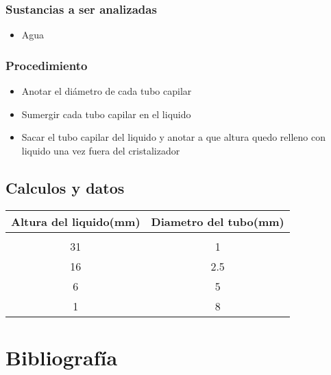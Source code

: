 \documentclass[11pt, letterpaper]{article}
\begin{document}
\subsubsection{Sustancias a ser analizadas}
\begin{itemize}
	\item Agua
\end{itemize}
\subsubsection{Procedimiento}
\begin{itemize}
	\item Anotar el diámetro de cada tubo capilar
	\item Sumergir cada tubo capilar en el liquido 
	\item Sacar el tubo capilar del liquido y anotar a que altura quedo relleno con liquido una vez fuera del cristalizador
\end{itemize}
\subsection{Calculos y datos}
  \begin{center}
    \begin{tabular}{|c|c|}
    \toprule
    \rowcolor[rgb]{ .776,  .878,  .706} Altura del liquido(mm) & Diametro del tubo(mm) \\
    \midrule
    \rowcolor[rgb]{ 1,  1,  0} \multicolumn{2}{|c|}{Agua} \\
    \midrule
    31    & 1 \\
    \midrule
    16    & 2.5 \\
    \midrule
    6     & 5 \\
    \midrule
    1     & 8 \\
    \bottomrule
    \end{tabular}%
  \end{center}

\section{Bibliografía}
\end{document}
